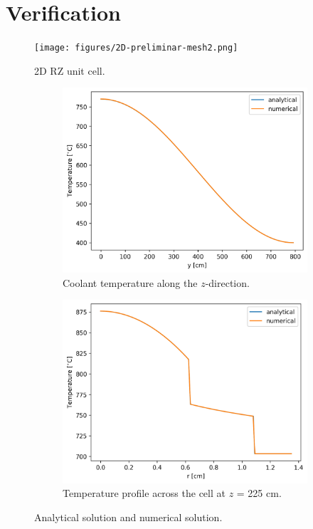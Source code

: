 \documentclass[11pt,letterpaper]{article}
\begin{document}
\section{Verification}





	\begin{figure}[htbp!]
		\centering
		\texttt{[image: figures/2D-preliminar-mesh2.png]}
		\hfill
		\caption{2D RZ unit cell.}
		\label{fig:axial}
	\end{figure}

	\begin{figure}[htbp!]
		\centering
		\begin{subfigure}[t]{0.4\textwidth}
			\centering
			\includegraphics[width=\linewidth]{figures-th/2D-preliminar-axial}
			\caption{Coolant temperature along the $z$-direction.}
		\end{subfigure}
		\begin{subfigure}[t]{0.4\textwidth}
			\centering
			\includegraphics[width=\linewidth]{figures-th/2D-preliminar-radial}
			\caption{Temperature profile across the cell at $z$ = 225 cm.}
		\end{subfigure}
		\hfill
		\caption{Analytical solution and numerical solution.}
		\label{fig:verification}
	\end{figure}
\end{document}
